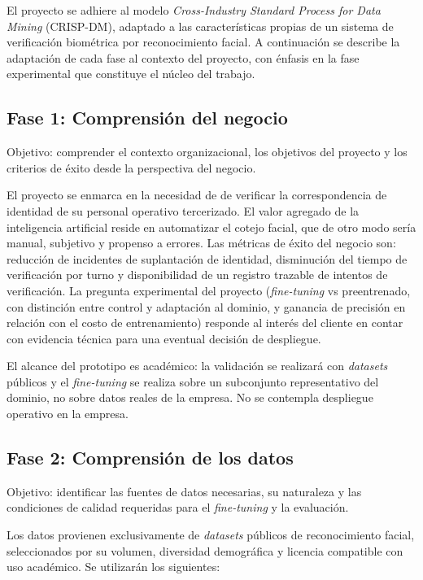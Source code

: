 \documentclass[
  11pt, %
]{charter}
\begin{document}
El proyecto se adhiere al modelo \textit{Cross-Industry Standard Process for Data Mining} (CRISP-DM), adaptado a las características propias de un sistema de verificación biométrica por reconocimiento facial. A continuación se describe la adaptación de cada fase al contexto del proyecto, con énfasis en la fase experimental que constituye el núcleo del trabajo.

\subsection{Fase 1: Comprensión del negocio}

Objetivo: comprender el contexto organizacional, los objetivos del proyecto y los criterios de éxito desde la perspectiva del negocio.

El proyecto se enmarca en la necesidad de \empclientename\hspace{1px} de verificar la correspondencia de identidad de su personal operativo tercerizado. El valor agregado de la inteligencia artificial reside en automatizar el cotejo facial, que de otro modo sería manual, subjetivo y propenso a errores. Las métricas de éxito del negocio son: reducción de incidentes de suplantación de identidad, disminución del tiempo de verificación por turno y disponibilidad de un registro trazable de intentos de verificación. La pregunta experimental del proyecto (\textit{fine-tuning} vs preentrenado, con distinción entre control y adaptación al dominio, y ganancia de precisión en relación con el costo de entrenamiento) responde al interés del cliente en contar con evidencia técnica para una eventual decisión de despliegue.

El alcance del prototipo es académico: la validación se realizará con \textit{datasets} públicos y el \textit{fine-tuning} se realiza sobre un subconjunto representativo del dominio, no sobre datos reales de la empresa. No se contempla despliegue operativo en la empresa.

\subsection{Fase 2: Comprensión de los datos}

Objetivo: identificar las fuentes de datos necesarias, su naturaleza y las condiciones de calidad requeridas para el \textit{fine-tuning} y la evaluación.

Los datos provienen exclusivamente de \textit{datasets} públicos de reconocimiento facial, seleccionados por su volumen, diversidad demográfica y licencia compatible con uso académico. Se utilizarán los siguientes:
\end{document}
